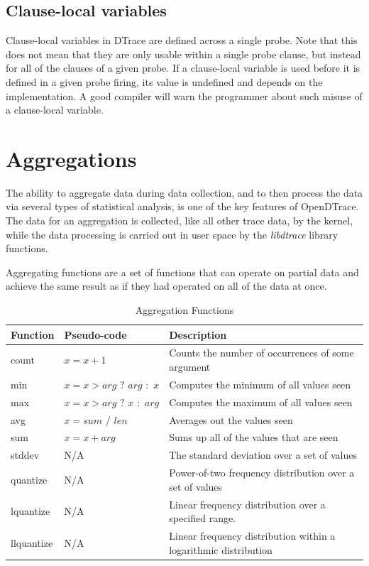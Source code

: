 \subsection{Clause-local variables}
\label{subsec:clause-local-variables}

Clause-local variables in DTrace are defined across a single probe. Note that
this does not mean that they are only usable within a single probe clause, but
instead for all of the clauses of a given probe. If a clause-local variable is
used before it is defined in a given probe firing, its value is undefined and
depends on the implementation. A good compiler will warn the programmer about
such misuse of a clause-local variable.

\section{Aggregations}
\label{sec:aggregations}

The ability to aggregate data during data collection, and to then
process the data via several types of statistical analysis, is one of
the key features of OpenDTrace.  The data for an aggregation is
collected, like all other trace data, by the kernel, while the data
processing is carried out in user space by the \emph{libdtrace}
library functions.

Aggregating functions are a set of functions that can operate on
partial data and achieve the same result as if they had operated
on all of the data at once.

\begin{table}
  \centering
  \begin{tabular}{l|l|l}
    Function & Pseudo-code & Description \\
    \hline
    count & $x = x + 1$ & Counts the number of occurrences of some argument \\
    min & $x = x > arg\,\, ?\,\, arg\,\, :\,\, x$ & Computes the minimum of all values seen \\
    max & $x = x > arg\,\, ?\,\, x\,\, :\,\, arg$ & Computes the maximum of all values seen \\
    avg & $x = sum\,\,/\,\,len$ & Averages out the values seen \\
    sum & $x = x + arg$ & Sums up all of the values that are seen \\
    stddev & N/A & The standard deviation over a set of values\\
    quantize & N/A & Power-of-two frequency distribution over a set of values\\
    lquantize & N/A & Linear frequency distribution over a specified range.\\
    llquantize & N/A & Linear frequency distribution within a logarithmic distribution
  \end{tabular}
  \caption{Aggregation Functions}
  \label{tab:agg-func}
\end{table}

